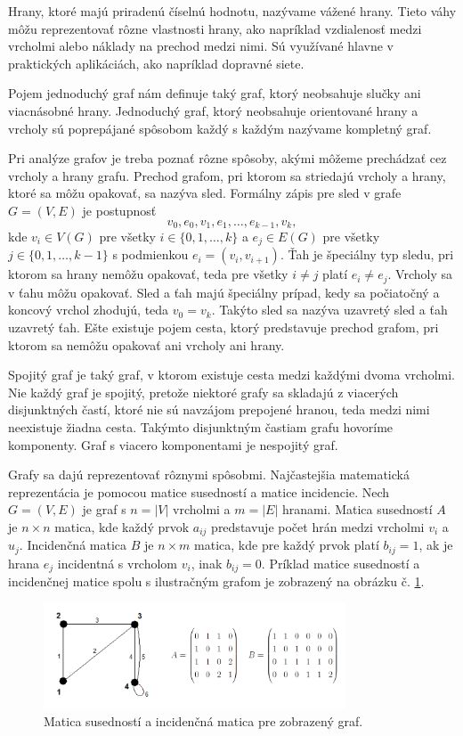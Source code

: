 Hrany, ktoré majú priradenú číselnú hodnotu, nazývame vážené hrany. Tieto váhy môžu reprezentovať rôzne vlastnosti hrany, 
ako napríklad vzdialenosť medzi vrcholmi alebo náklady na prechod medzi nimi. Sú využívané hlavne v praktických aplikáciách,
ako napríklad dopravné siete.

Pojem jednoduchý graf nám definuje taký graf, ktorý neobsahuje slučky ani viacnásobné hrany. Jednoduchý graf, ktorý neobsahuje 
orientované hrany a vrcholy sú poprepájané spôsobom každý s každým nazývame kompletný graf\cite{markovsovadynamika}.

Pri analýze grafov je treba poznať rôzne spôsoby, akými môžeme prechádzať cez vrcholy a hrany grafu.
Prechod grafom, pri ktorom sa striedajú vrcholy a hrany, ktoré sa môžu opakovať, sa nazýva sled.
Formálny zápis pre sled v grafe $G = (V, E)$ je postupnosť 
\[
v_0, e_0, v_1, e_1, \dots, e_{k-1}, v_{k},
\]
kde $v_i \in V(G)$ pre všetky $i \in \{0, 1, \dots, k\}$ a $e_j \in E(G)$ pre všetky $j \in \{0, 1, \dots, k-1\}$ s podmienkou
$e_i = (v_i, v_{i+1})$. Ťah je špeciálny typ sledu, pri ktorom sa hrany nemôžu opakovať, teda pre všetky $i \neq j$ platí $e_i \neq e_j$.
Vrcholy sa v ťahu môžu opakovať. Sled a ťah majú špeciálny prípad, kedy sa počiatočný a koncový vrchol zhodujú, teda $v_0 = v_k$.
Takýto sled sa nazýva uzavretý sled a ťah uzavretý ťah. Ešte existuje pojem cesta, ktorý predstavuje prechod grafom, pri ktorom sa
nemôžu opakovať ani vrcholy ani hrany.

Spojitý graf je taký graf, v ktorom existuje cesta medzi každými dvoma vrcholmi. Nie každý graf je spojitý, pretože niektoré grafy sa
skladajú z viacerých disjunktných častí, ktoré nie sú navzájom prepojené hranou, teda medzi nimi neexistuje žiadna cesta. Takýmto
disjunktným častiam grafu hovoríme komponenty. Graf s viacero komponentami je nespojitý graf.

Grafy sa dajú reprezentovať rôznymi spôsobmi. Najčastejšia matematická reprezentácia je pomocou matice susedností a matice incidencie.
Nech $G = (V, E)$ je graf s $n = |V|$ vrcholmi a $m = |E|$ hranami. Matica susedností $A$ je $n \times n$ matica, kde každý prvok $a_{ij}$
predstavuje počet hrán medzi vrcholmi $v_i$ a $u_j$. Incidenčná matica $B$ je $n \times m$ matica, kde pre každý prvok platí $b_{ij} = 1$,
ak je hrana $e_j$ incidentná s vrcholom $v_i$, inak $b_{ij} = 0$.
Príklad matice susedností a incidenčnej matice spolu s ilustračným grafom je zobrazený na obrázku č. \ref{obr:matrices}.

\begin{figure}
    \centerline{\includegraphics[width=0.8\textwidth]{images/matrices.png}}
    \caption[Matica susedností a incidenčná matica.]{Matica susedností a incidenčná matica pre zobrazený graf.}
    \label{obr:matrices}
\end{figure}

